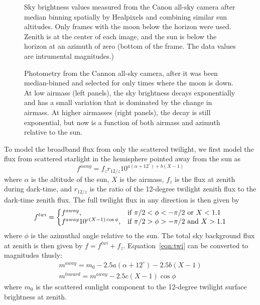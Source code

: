 \documentclass{emulateapj}  %
\begin{document}
\begin{figure*}
  \caption{Sky brightness values measured from the Canon all-sky camera after median binning spatially by Healpixels and combining similar sun altitudes. Only frames with the moon below the horizon were used. Zenith is at the center of each image, and the sun is below the horizon at an azimuth of zero (bottom of the frame. The data values are intrumental magnitudes.)  \label{fig:twiSky}}
\end{figure*}



\begin{figure*}
  \caption{Photometry from the Cannon all-sky camera, after it was been median-binned and selected for only times where the moon is down.  At low airmass (left panels), the sky brightness decays exponentially and has a small variation that is dominated by the change in airmass.  At higher airmasses (right panels), the decay is still exponential, but now is a function of both airmass and azimuth relative to the sun. \label{fig:twiExp}}
\end{figure*}



To model the broadband flux from only the scattered twilight, we first model the flux from scattered starlight in the hemisphere pointed away from the sun as
\begin{equation}\label{eqn:twi1}
  f^{away} = f_{z} r_{12/z} 10^{a(\alpha+12^{\circ})+b(X-1)}
\end{equation}
where $\alpha$ is the altitude of the sun, $X$ is the airmass, $f_{z}$ is the flux at zenith during dark-time, and $r_{12/z}$ is the ratio of the 12-degree twilight zenith flux to the dark-time zenith flux. The full twilight flux in any direction is then given by
\begin{equation}
  \label{eqn:twi}
  f^{twi}  = \left\{
  \begin{array}{@{}ll@{}}
        f^{away}, & \text{if}\  \pi/2 < \phi < -\pi/2  \text{ or } X < 1.1\\
        f^{away} 10^{c (X-1) \cos{\phi}}, &  \text{if}\   \pi/2 > \phi >  -\pi/2 \text{ and } X > 1.1
        \end{array} \right.
\end{equation}
where $\phi$ is the azimuthal angle relative to the sun. The total sky background flux at zenith is then given by $f = f^{twi} + f_{z}$. Equation~\ref{eqn:twi} can be converted to magnitudes thusly:
\begin{eqnarray}
  m^{away} = m_0 -2.5a(\alpha+12^{\circ})-2.5b(X-1) \\
  m^{toward} = m^{away} -2.5c(X-1)\cos{\phi}
\end{eqnarray}
where $m_0$ is the scattered sunlight component to the 12-degree twilight surface brightness at zenith.  
\end{document}
